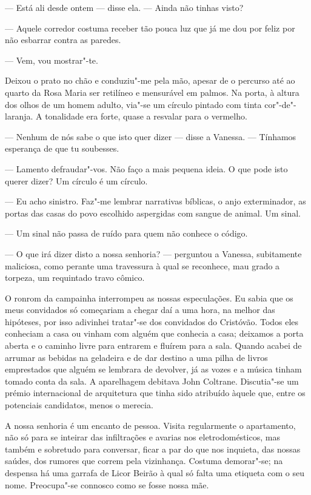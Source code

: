 --- Está ali desde ontem --- disse ela. --- Ainda não tinhas visto?

--- Aquele corredor costuma receber tão pouca luz que já
me dou por feliz por não esbarrar contra as paredes.

--- Vem, vou mostrar"-te.

Deixou o prato no chão e conduziu"-me pela mão, apesar de o percurso até
ao quarto da Rosa Maria ser retilíneo e mensurável em palmos. Na porta,
à altura dos olhos de um homem adulto, via"-se um círculo pintado com
tinta cor"-de"-laranja. A tonalidade era forte, quase a resvalar para o vermelho.

--- Nenhum de nós sabe o que isto quer dizer --- disse a Vanessa. ---
  Tínhamos esperança de que tu soubesses.

--- Lamento defraudar"-vos. Não faço a mais pequena ideia. O que pode isto
  querer dizer? Um círculo é um círculo.

--- Eu acho sinistro. Faz"-me lembrar narrativas bíblicas, o anjo
  exterminador, as portas das casas do povo escolhido aspergidas com
  sangue de animal. Um sinal.

--- Um sinal não passa de ruído para quem não conhece o código.

--- O que irá dizer disto a nossa senhoria? --- perguntou a Vanessa,
  subitamente maliciosa, como perante uma travessura à qual se
  reconhece, mau grado a torpeza, um requintado travo cômico.

O ronrom da campainha interrompeu as nossas especulações. Eu sabia que
os meus convidados só começariam a chegar daí a uma hora, na melhor
das hipóteses, por isso adivinhei tratar"-se dos convidados do Cristóvão.
Todos eles conheciam a casa ou vinham com alguém que conhecia a casa;
deixamos a porta aberta e o caminho livre para entrarem e fluírem para a
sala. Quando acabei de arrumar as bebidas na geladeira e de dar
destino a uma pilha de livros emprestados que alguém se lembrara de
devolver, já as vozes e a música tinham tomado conta da sala. A
aparelhagem debitava John Coltrane.
Discutia"-se um prémio internacional de arquitetura que tinha sido
atribuído àquele que, entre os potenciais candidatos, menos o merecia.


\medskip
\asterisc
\medskip

A nossa senhoria é um encanto de pessoa. Visita regularmente o
apartamento, não só para se inteirar das infiltrações e avarias nos
eletrodomésticos, mas também e sobretudo para conversar, ficar a par
do que nos inquieta, das nossas saúdes, dos rumores que correm pela
vizinhança. Costuma demorar"-se; na despensa há uma garrafa de Licor
Beirão à qual só falta uma etiqueta com o seu nome. Preocupa"-se connosco
como se fosse nossa mãe.

